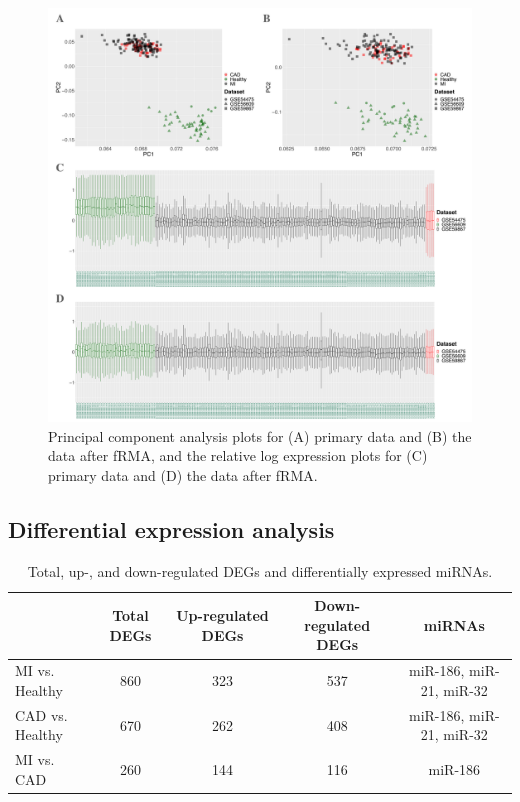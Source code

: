 \documentclass[sn-mathphys,Numbered]{sn-jnl}%
\theoremstyle{thmstyleone}%
\theoremstyle{thmstyletwo}%
\theoremstyle{thmstylethree}%
\begin{document}
\begin{figure}
\centering
\includegraphics[width=1\linewidth]{PCA and RLE of trains} \caption{Principal component analysis plots for (A) primary data and (B) the data after fRMA, and the relative log expression plots for (C) primary data and (D) the data after fRMA.}
\label{fig:PCA}
\end{figure}

\subsection{Differential expression
analysis}\label{differential-expression-analysis-1}

\begin{table}
\centering
\caption{Total, up-, and down-regulated DEGs and differentially expressed miRNAs.}
\label{tab:DEGstab}
\begin{tabular*}{\textwidth}{@{\extracolsep\fill}lcccc}
\toprule
& Total DEGs & Up-regulated DEGs & Down-regulated DEGs & miRNAs\\
\midrule
MI vs. Healthy & 860 & 323 & 537 & miR-186, miR-21, miR-32\\
CAD vs. Healthy & 670 & 262 & 408 & miR-186, miR-21, miR-32\\
MI vs. CAD & 260 & 144 & 116 & miR-186\\
\bottomrule
\end{tabular*}
\end{table}
\end{document}
